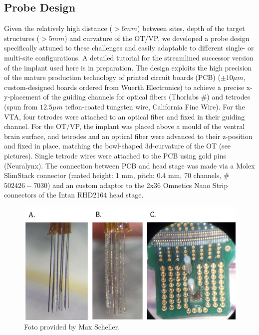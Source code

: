 \subsection{Probe Design}
Given the relatively high distance ($>6 mm$) between sites, depth of the target structures ($>5 mm$) and curvature of the OT/VP,  we developed a probe design specifically attuned to these challenges and easily adaptable to different single- or multi-site configurations. A detailed tutorial for the streamlined successor version of the implant used here is in preparation. The design exploits the high precision of the mature production technology of printed circuit boards (PCB)  ($\pm10\mu m$, custom-designed boards ordered from Wuerth Electronics) to achieve a precise x-y-placement of the guiding channels for optical fibers (Thorlabs \#) and tetrodes (spun from $12.5 \mu m$ teflon-coated tungsten wire, California Fine Wire).  For the VTA, four tetrodes were attached to an optical fiber and fixed in their guiding channel.  For the OT/VP, the implant was placed above a mould of the ventral brain surface, and tetrodes and an optical fiber were advanced to their z-position and fixed in place, matching the bowl-shaped 3d-curvature of the OT (see pictures). Single tetrode wires were attached to the PCB using gold pins (Neuralynx). The connection between PCB and head stage was made via a Molex SlimStack connector (mated height: 1 mm, pitch: 0.4 mm, 70 channels, \# $502426-7030$) and an custom adaptor to the 2x36 Omnetics Nano Strip connectors of the Intan RHD2164 head stage.\\ 
\begin{figure}
    \centering
    \includegraphics[scale=0.4]{figures/Implant.png}
    \caption{Foto provided by Max Scheller.}
    \label{fig:implant}
\end{figure}
